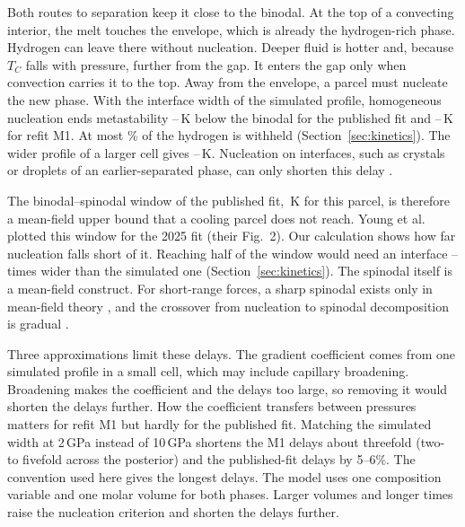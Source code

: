 Both routes to separation keep it close to the binodal. At the top of a convecting interior, the
melt touches the envelope, which is already the hydrogen-rich phase. Hydrogen can leave there
without nucleation. Deeper fluid is hotter and, because $T_C$ falls with pressure, further from
the gap. It enters the gap only when convection carries it to the top. Away from the envelope, a
parcel must nucleate the new phase. With the interface width of the simulated profile,
homogeneous nucleation ends metastability \dlyFigOneCPubLo{}--\dlyFigOneCPubHi{}\,K below the
binodal for the published fit and \dlyFigOneCMOneLo{}--\dlyFigOneCMOneHi{}\,K for refit M1. At
most \whFigOneCPubHi{}\% of the hydrogen is withheld (Section~\ref{sec:kinetics}). The wider
profile of a larger cell gives \dlyYoungPubLo{}--\dlyYoungPubHi{}\,K. Nucleation on interfaces,
such as crystals or droplets of an earlier-separated phase, can only shorten this delay
\cite{shea2017}.

The binodal--spinodal window of the published fit, \pubIntTwo{}\,K for this parcel, is therefore
a mean-field upper bound that a cooling parcel does not reach. Young et al.\ \cite{young2025}
plotted this window for the 2025 fit (their Fig.~2). Our calculation shows how far nucleation
falls short of it. Reaching half of the window would need an interface
\halfWinRatioLo{}--\halfWinRatioHi{} times wider than the simulated one
(Section~\ref{sec:kinetics}). The spinodal itself is a mean-field construct. For short-range forces, a sharp spinodal exists
only in mean-field theory \cite{klein1983}, and the crossover from nucleation to spinodal
decomposition is gradual \cite{binder1984}.

Three approximations limit these delays. The gradient coefficient comes from one simulated
profile in a small cell, which may include capillary broadening. Broadening makes the
coefficient and the delays too large, so removing it would shorten the delays further. How the
coefficient transfers between pressures matters for refit M1 but hardly for the published fit.
Matching the simulated width at 2\,GPa instead of 10\,GPa shortens the M1 delays about
threefold (two- to fivefold across the posterior) and the published-fit delays by 5--6\%. The
convention used here gives the longest delays.
The model uses one composition variable and one molar volume for both phases. Larger volumes
and longer times raise the nucleation criterion and shorten the delays further.

